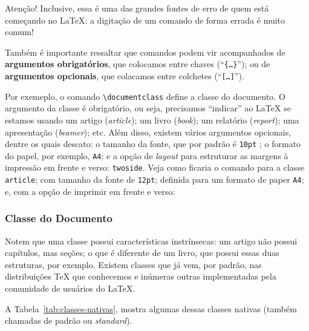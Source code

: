 \begin{atencao}{Atenção!}{\exclamacao}
  Inclusive, essa é uma das grandes fontes de erro de quem está começando no 
  \LaTeX: a digitação de um comando de forma errada é muito comum!
\end{atencao}

Também é importante ressaltar que comandos podem vir acompanhados de 
\textbf{\textsf{argumentos obrigatórios}}, que colocamos entre \textsf{chaves} 
(``\texttt{\{\ldots\}}''); ou de \textbf{\textsf{argumentos opcionais}}, que colacamos 
entre \textsf{colchetes} (``\texttt{[\ldots]}'').

Por exemeplo, o comando \verb|\documentclass| define a \textsf{classe} do 
documento.
O argumento da classe é obrigatório, ou seja, precisamos ``indicar'' ao \LaTeX{}
se estamos usando um \textsf{artigo} (\textit{article}); um \textsf{livro} 
(\textit{book}); um relatório (\textit{report}); uma apresentação (\textit{beamer});
etc.
Além disso, existem vários argumentos opcionais, dentre os quais descato: o 
tamanho da fonte, que por padrão é \texttt{10pt}
; o formato do papel, por exemplo, \texttt{A4}; e a opção de \textit{layout} para
estruturar as margens à impressão em frente e verso: \texttt{twoside}.
Veja como ficaria o comando para a classe \texttt{article}; com tamanho da fonte 
de \texttt{12pt}; definida para um formato de paper \texttt{A4}; e, com a opção 
de imprimir em frente e verso:

% 
  \subsubsection{Classe do Documento}
% 
Notem que uma \textsf{classe} possui características instrínsecas: um artigo 
não possui capítulos, mas seções; o que é diferente de um livro, que possui 
essas duas estruturas, por exemplo.
Existem \textsf{classes} que já vem, por padrão, nas distribuições \TeX{} que 
conhecemos e inúmeras outras implementadas pela comunidade de usuários do \LaTeX.

A Tabela~\ref{tab:classes-nativas}, mostra algumas dessas \textsf{classes} 
\textsf{nativas} (também chamadas de \textsf{padrão} ou \textit{standard}).


